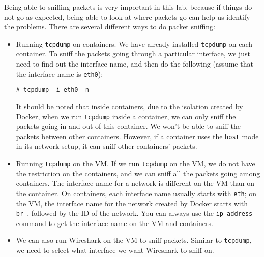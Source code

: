 
Being able to sniffing packets is very
important in this lab, because if things do not go as expected, being
able to look at where packets go can help us identify the problems.
There are several different ways to do packet sniffing:


\begin{itemize}
\item Running \texttt{tcpdump} on containers.
We have already installed \texttt{tcpdump}
on each container. To sniff the packets going through a particular
interface, we just need to find out the interface name, and then do the
following (assume that the interface name is \texttt{eth0}):

\begin{lstlisting}
# tcpdump -i eth0 -n
\end{lstlisting}

It should be noted that inside containers, due to the isolation created by
Docker, when we run \texttt{tcpdump} inside a container,
we can only sniff the packets going in and out of this container.
We won't be able to sniff the packets between other containers. 
However, if a container uses the \texttt{host} mode in its 
network setup, it can sniff other containers' packets. 


\item Running \texttt{tcpdump} on the VM. If we run \texttt{tcpdump}
on the VM, we do not have the restriction on the containers, and
we can sniff all the packets going among containers. The interface
name for a network is different on the VM than on the container.
On containers, each interface name usually starts with \texttt{eth};
on the VM, the interface name for the network created
by Docker starts with \texttt{br-}, followed by the ID of the network.
You can always use the \texttt{ip address} command to get the
interface name on the VM and containers.

\item We can also run Wireshark on the VM to sniff packets.
Similar to \texttt{tcpdump}, we need to select what interface
we want Wireshark to sniff on.
\end{itemize}


